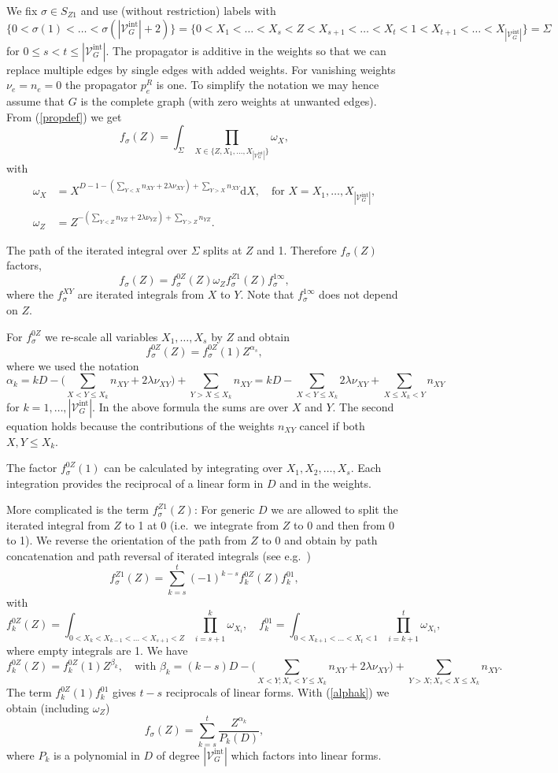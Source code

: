 \documentclass[oneside]{amsart}
\newcommand{\dd}{\mathrm{d}}
\newcommand{\sV}{\mathcal{V}}
\newcommand{\sVGint}{{\sV_G^\mathrm{int}}}
\newcommand{\VGint}{{|\sVGint|}}
\theoremstyle{plain}
\begin{document}
We fix $\sigma\in S_{Z1}$ and use (without restriction) labels with $\{0<\sigma(1)<\ldots<\sigma(\VGint+2)\}=\{0<X_1<\ldots<X_s<Z<X_{s+1}<\ldots<X_t<1<X_{t+1}<\ldots<X_\VGint\}=\Sigma$
for $0\leq s<t\leq\VGint$.
The propagator is additive in the weights so that we can replace multiple edges by single edges with added weights. For vanishing weights $\nu_e=n_e=0$ the propagator $p^R_e$ is one.
To simplify the notation we may hence assume that $G$ is the complete graph (with zero weights at unwanted edges).
From (\ref{propdef}) we get
$$
f_\sigma(Z)=\int_\Sigma\prod_{X\in\{Z,X_1,\ldots,X_\VGint\}}\omega_X,
$$
with
\begin{align*}
\omega_X&=X^{D-1-(\sum_{Y<X}n_{XY}+2\lambda\nu_{XY})+\sum_{Y>X}n_{XY}}\dd X,\quad\text{for }X=X_1,\ldots,X_\VGint,\\
\omega_Z&=Z^{-(\sum_{Y<Z}n_{YZ}+2\lambda\nu_{YZ})+\sum_{Y>Z}n_{YZ}}.
\end{align*}

The path of the iterated integral over $\Sigma$ splits at $Z$ and 1. Therefore $f_\sigma(Z)$ factors,
$$
f_\sigma(Z)=f^{0Z}_\sigma(Z)\omega_Zf^{Z1}_\sigma(Z)f^{1\infty}_\sigma,
$$
where the $f^{XY}_\sigma$ are iterated integrals from $X$ to $Y$. Note that $f^{1\infty}_\sigma$ does not depend on $Z$.

For $f^{0Z}_\sigma$ we re-scale all variables $X_1,\ldots,X_s$ by $Z$ and obtain
$$
f^{0Z}_\sigma(Z)=f^{0Z}_\sigma(1)Z^{\alpha_s},
$$
where we used the notation
\begin{equation}\label{alphak}
\alpha_k=kD-\Big(\sum_{X<Y\leq X_k}n_{XY}+2\lambda\nu_{XY}\Big)+\sum_{Y>X\leq X_k}n_{XY}=kD-\sum_{X<Y\leq X_k}2\lambda\nu_{XY}+\sum_{X\leq X_k<Y}n_{XY}
\end{equation}
for $k=1,\ldots,\VGint$. In the above formula the sums are over $X$ and $Y$. The second equation holds because the contributions of the weights $n_{XY}$ cancel if both $X,Y\leq X_k$.

The factor $f^{0Z}_\sigma(1)$ can be calculated by integrating over $X_1,X_2,\ldots,X_s$. Each integration provides the reciprocal of a linear form in $D$ and in the weights.

More complicated is the term $f^{Z1}_\sigma(Z)$: For generic $D$ we are allowed to split the iterated integral from $Z$ to 1 at 0 (i.e.\ we integrate from $Z$ to 0 and then from 0 to 1).
We reverse the orientation of the path from $Z$ to 0 and obtain by path concatenation and path reversal of iterated integrals (see e.g.\ \cite{gf})
$$
f^{Z1}_\sigma(Z)=\sum_{k=s}^t(-1)^{k-s}f^{0Z}_k(Z)f^{01}_k,
$$
with
$$
f^{0Z}_k(Z)=\int_{0<X_k<X_{k-1}<\ldots<X_{s+1}<Z}\prod_{i=s+1}^k\omega_{X_i},\quad f^{01}_k=\int_{0<X_{k+1}<\ldots<X_t<1}\prod_{i=k+1}^t\omega_{X_i},
$$
where empty integrals are 1. We have
$$
f^{0Z}_k(Z)=f^{0Z}_k(1)Z^{\beta_k},\quad\text{with }\beta_k=(k-s)D-\Big(\sum_{X<Y;X_s<Y\leq X_k}n_{XY}+2\lambda\nu_{XY}\Big)+\sum_{Y>X;X_s<X\leq X_k}n_{XY}.
$$
The term $f^{0Z}_k(1)f^{01}_k$ gives $t-s$ reciprocals of linear forms. With (\ref{alphak}) we obtain (including $\omega_Z$)
$$
f_\sigma(Z)=\sum_{k=s}^t\frac{Z^{\alpha_k}}{P_k(D)},
$$
where $P_k$ is a polynomial in $D$ of degree $\VGint$ which factors into linear forms.
\end{document}
